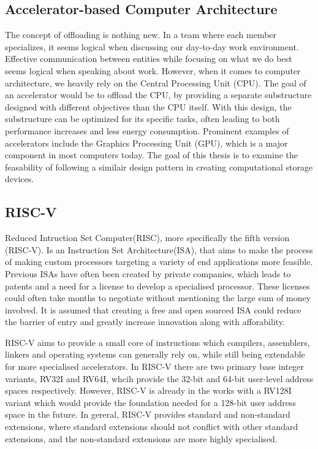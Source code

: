 \subsection{Accelerator-based Computer Architecture}
The concept of offloading is nothing new. In a team where each member
specializes, it seems logical when discussing our day-to-day work environment.
Effective communication between entities while focusing on what we do best seems
logical when speaking about work. However, when it comes to computer
architecture, we heavily rely on the Central Processing Unit (CPU). The goal of
an accelerator would be to offload the CPU, by providing a separate
substructure designed with different objectives than the CPU itself.
With this design, the substructure can be optimized for its
specific tasks, often leading to both performance increases and less energy
consumption\cite{AA}. Prominent examples of accelerators include the Graphics
Processing Unit (GPU), which is a major component in most computers today. The
goal of this thesis is to examine the feasability of following a similair design
pattern in creating computational storage devices.

\subsection{RISC-V}
Reduced Intruction Set Computer(RISC), more specifically the fifth version
(RISC-V). Is an Instruction Set Architecture(ISA), that aims to make the process
of making custom processors targeting a variety of end applications more
feasible. Previous ISAs have often been created by private companies, which
leads to patents and a need for a license to develop a specialised processor.
These licenses could often take months to negotiate without mentioning the large
sum of money involved. It is assumed that creating a free and open sourced ISA
could reduce the barrier of entry and greatly increase innovation along with
afforability\cite{ISAfree}.

RISC-V aims to provide a small core of instructions which compilers, assemblers,
linkers and operating systems can generally rely on, while still being
extendable for more specialised accelerators. In RISC-V there  are two primary
base integer variants, RV32I and RV64I, whcih provide the 32-bit and 64-bit
user-level address spaces respectively. However, RISC-V is already in the works
with a RV128I variant which would provide the foundation needed for a 128-bit
user address space in the future. In gereral, RISC-V provides standard and
non-standard extensions, where standard extensions should not conflict with
other standard extensions, and the non-standard extensions are more highly
specialised.


